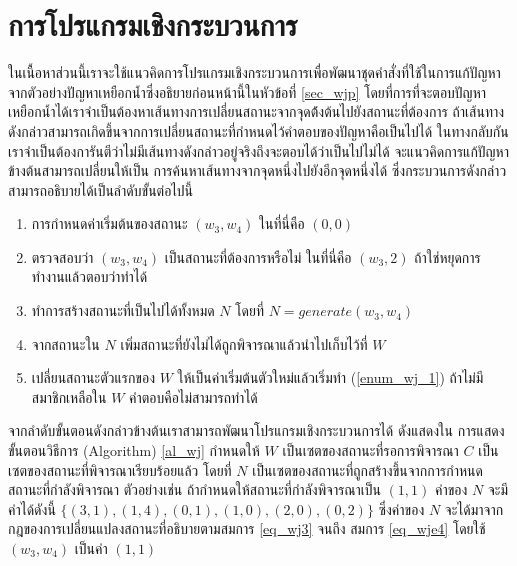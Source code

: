 \section{การโปรแกรมเชิงกระบวนการ}
%
%
%
\par{
ในเนื้อหาส่วนนี้เราจะใช้แนวคิดการโปรแกรมเชิงกระบวนการเพื่อพัฒนาชุดคำสั่งที่ใช้ในการแก้ปัญหาจากตัวอย่างปัญหาเหยือกน้ำซึ่งอธิยายก่อนหน้านี้ในหัวข้อที่ \ref{sec_wjp}
โดยที่การที่จะตอบปัญหาเหยือกน้ำได้เราจำเป็นต้องหาเส้นทางการเปลี่ยนสถานะจากจุดต้้งต้นไปยังสถานะที่ต้องการ 
ถ้าเส้นทางดังกล่าวสามารถเกิดขึ้นจากการเปลี่ยนสถานะที่กำหนดไว้คำตอบของปัญหาคือเป็นไปได้
ในทางกลับกันเราจำเป็นต้องการันตีว่าไม่มีเส้นทางดังกล่าวอยู่จริงถึงจะตอบได้ว่าเป็นไปไม่ได้
จะแนวคิดการแก้ปัญหาข้างต้นสามารถเปลี่ยนให้เป็น 
การค้นหาเส้นทางจากจุดหนึ่งไปยังอีกจุดหนึ่งได้ 
ซึ่งกระบวนการดังกล่าวสามารถอธิบายได้เป็นลำดับขั้นต่อไปนี้ 
%
\begin{enumerate}
\item \label{enum_wj_1} การกำหนดค่าเริ่มต้นของสถานะ $(w_3,w_4)$ ในที่นี่คือ $(0,0)$ 
\item ตรวจสอบว่า $(w_3,w_4)$ เป็นสถานะที่ต้องการหรือไม่ ในที่นี่คือ $(w_3,2)$ 
ถ้าใช่หยุดการทำงานแล้วตอบว่าทำได้
\item ทำการสร้างสถานะที่เป็นไปได้ทั้งหมด $N$ โดยที่ $N = generate(w_3,w_4)$
\item จากสถานะใน $N$ เพิ่มสถานะที่ยังไม่ได้ถูกพิจารณาแล้วนำไปเก็บไว้ที่ $W$
\item เปลี่ยนสถานะตัวแรกของ $W$ ให้เป็นค่าเริ่มต้นตัวใหม่แล้วเริ่มทำ (\ref{enum_wj_1}) 
ถ้าไม่มีสมาชิกเหลือใน $W$ คำตอบคือไม่สามารถทำได้
\end{enumerate}
%
จากลำดับขั้นตอนดังกล่าวข้างต้นเราสามารถพัฒนาโปรแกรมเชิงกระบวนการได้
ดังแสดงใน 
การแสดงขั้นตอนวิธีการ (Algorithm) \ref{al_wj}
กำหนดให้ $W$ เป็นเซตของสถานะที่รอการพิจารณา $C$ เป็นเซตของสถานะที่พิจารณาเรียบร้อยแล้ว
โดยที่ $N$ เป็นเซตของสถานะที่ถูกสร้างขึ้นจากการกำหนดสถานะที่กำลังพิจารณา 
ตัวอย่างเช่น ถ้ากำหนดให้สถานะที่กำลังพิจารณาเป็น $(1,1)$
ค่าของ $N$ จะมีค่าได้ดังนี้ $\{(3,1),(1,4),(0,1),(1,0),(2,0),(0,2)\}$
ซึ่งค่าของ $N$ จะได้มาจากกฎของการเปลี่ยนแปลงสถานะที่อธิบายตามสมการ \ref{eq_wj3}
จนถึง สมการ \ref{eq_wje4} โดยใช้ $(w_3,w_4)$ เป็นค่า $(1,1)$
}
%

